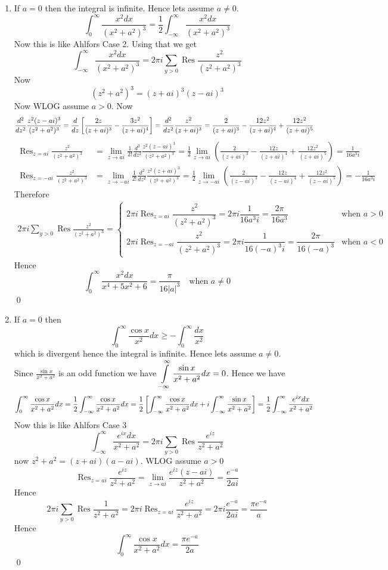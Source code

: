 \documentclass[a4paper, 11pt]{article}
\newcommand{\Res}{\operatorname{Res}}
\begin{document}
{\begin{enumerate}[label=(\alph*)]
\item If $a=0$ then the integral is infinite. Hence lets assume $a\neq 0$. $$\int_0^{\infty} \frac{x^2dx}{(x^2+a^2)^3}=\frac12\int_{-\infty}^{\infty} \frac{x^2dx}{(x^2+a^2)^3}$$Now this is like Ahlfors Case 2. Using that we get $$\int _{-\infty}^{\infty}\frac{x^2dx}{(x^2+a^2)^3}=2\pi i \sum_{y>0}\operatorname{Res}\frac{z^2}{(z^2+a^2)^3}$$Now $$(z^2+a^2)^3=(z+ai)^3(z-ai)^3$$Now WLOG assume $a>0$. Now $$\frac{d^2}{dz^2}\frac{z^2(z-ai)^3}{(z^2+a^2)^3}=\frac{d}{dz}\left[  \frac{2z}{(z+ai)^3}-\frac{3z^2}{(z+ai)^4}\right]=\frac{d^2}{dz^2}\frac{z^2}{(z+ai)^3}=\frac{2}{(z+ai)^3}-\frac{12z^2}{(z+ai)^4}+\frac{12z^2}{(z+ai)^5}$$  \begin{align*}
	\Res_{z=ai} \frac{z^2}{(z^2+a^2)^3} & =\lim\limits_{z\to ai}\frac1{2!}\frac{d^2}{dz^2}\frac{z^2(z-ai)^3}{(z^2+a^2)^3}=\frac{1}{2} \lim _{z \rightarrow a i}\left(\frac{2}{(z+a i)^3}-\frac{12 z}{(z+a i)^4}+\frac{12 z^2}{(z+a i)^5}\right)=\frac{1}{16 a^3 i}\\
	\Res_{z=-ai} \frac{z^2}{(z^2+a^2)^3} & =\lim\limits_{z\to -ai}\frac1{2!}\frac{d^2}{dz^2}\frac{z^2(z+ai)^3}{(z^2+a^2)^3}=\frac{1}{2} \lim _{z \rightarrow -a i}\left(\frac{2}{(z-a i)^3}-\frac{12 z}{(z-a i)^4}+\frac{12 z^2}{(z-a i)^5}\right)=-\frac{1}{16 a^3 i}
\end{align*}Therefore \begin{align*}
2\pi i \sum_{y>0}\operatorname{Res}\frac{z^2}{(z^2+a^2)^3}=\begin{cases}
	2\pi i	\Res_{z=ai} \dfrac{z^2}{(z^2+a^2)^3}  = 2\pi i \dfrac{1}{16 a^3 i}=\dfrac{2\pi}{16a^3} & \text{when $a>0$}\\
	2\pi i	\Res_{z=-ai} \dfrac{z^2}{(z^2+a^2)^3}  = 2\pi i \dfrac{1}{16 (-a)^3 i}=\dfrac{2\pi}{16(-a)^3} & \text{when $a<0$}
\end{cases}
\end{align*}Hence $$\int_0^{\infty} \frac{x^2dx}{x^4+5x^2+6}= \frac{\pi}{16|a|^3}\quad \text{when }a\neq 0$$\qed


\item If $a=0$ then $$\int_0^{\infty}\frac{\cos x}{x^2}dx\geq -\int_0^{\infty}\frac{dx}{x^2}$$ which is divergent hence the integral is infinite. Hence lets assume $a\neq 0$. Since $\frac{\sin x}{x^2+a^2}$ is an odd function we have $\displaystyle{\int\limits_{-\infty}^{\infty}\frac{\sin x}{x^2+a^2}dx=0}$. Hence we have $$\int_0^{\infty}\frac{\cos x}{x^2+a^2}dx=\frac12\int_{-\infty}^{\infty}\frac{\cos x}{x^2+a^2}dx=\frac12\left[ \int_{-\infty}^{\infty}\frac{\cos x}{x^2+a^2}dx +i\int_{-\infty}^{\infty}\frac{\sin x}{x^2+a^2}\right]=\frac12\int_{-\infty}^{\infty}\frac{e^{ix}dx}{x^2+a^2}$$ Now this is like Ahlfors Case 3 $$\int_{-\infty}^{\infty}\frac{e^{ix}dx}{x^2+a^2}=2\pi i\sum\limits_{y>0} \Res \frac{e^{iz}}{z^2+a^2}$$now $z^2+a^2=(z+ai)(a-ai)$. WLOG assume $a>0$ $$\Res_{z=ai}\frac{e^{iz}}{z^2+a^2}=\lim\limits_{z\to ai} \frac{e^{iz}(z-ai)}{z^2+a^2}=\frac{e^{-a}}{2ai}$$ Hence $$2\pi i\sum\limits_{y>0}\Res \frac{1}{z^2+a^2}=2\pi i\Res_{z=ai}\frac{e^{iz}}{z^2+a^2}=2\pi i \frac{e^{-a}}{2ai}=\frac{\pi e^{-a}}{a}$$Hence  $$\int_0^{\infty}\frac{\cos x}{x^2+a^2}dx=\frac{\pi e^{-a}}{2a}$$\qed


\end{enumerate}}
\end{document}
